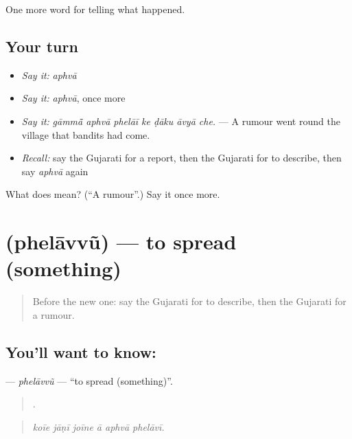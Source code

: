 \begin{grammarlens}[title={What you've built}]
One more word for telling what happened.
\end{grammarlens}

\subsection*{Your turn}
\begin{itemize}
\raggedright
  \item \emph{Say it:} \emph{aphvā}
  \item \emph{Say it:} \emph{aphvā}, once more
  \item \emph{Say it:} \emph{gāmmā̃ aphvā phelāī ke ḍāku āvyā che.} — A rumour went round the village that bandits had come.
  \item \emph{Recall:} say the Gujarati for a report, then the Gujarati for to describe, then say \emph{aphvā} again
\end{itemize}

\begin{tcolorbox}[breakable,colback=teal!4,colframe=teal!35!black,title={Before you move on}]
What does  mean? (\textquotedblleft{}A rumour\textquotedblright{}.) Say it once more.
\end{tcolorbox}
\section[\texorpdfstring{\gu{ફેલાવવું} (phelāvvũ)}{ફેલાવવું (phelāvvũ)}]{ (phelāvvũ) — to spread (something)}

\label{lesson:GU-C313-phelavvu}



\begin{quote}
Before the new one: say the Gujarati for to describe, then the Gujarati for a rumour.
\end{quote}

\subsection*{You'll want to know: }
\textbf{} — \emph{phelāvvũ} — \textquotedblleft{}to spread (something)\textquotedblright{}.

\begin{quote}
     .
\end{quote}

\begin{quote}
\emph{koīe jāṇī joīne ā aphvā phelāvī.}
\end{quote}


